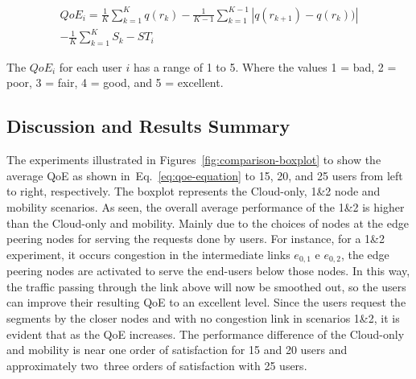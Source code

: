 \begin{equation}\label{eq:qoe-equation}
\begin{split}
QoE_i = \frac{1}{K} \sum_{k=1}^{K}q(r_{k}) - \frac{1}{K-1} \sum_{k=1}^{K-1}|q(r_{k+1}) - q(r_{k}))| \\
- \frac{1}{K}\sum_{k=1}^{K} S_{k} - ST_{i}
\end{split}
\end{equation}

The $QoE_{i}$ for each user $i$ has a range of 1 to 5. Where the values 1 = bad, 2 = poor, 3 = fair, 4 = good, and 5 = excellent.



\subsection{Discussion and Results Summary}


The experiments illustrated in Figures~\ref{fig:comparison-boxplot} to show the average QoE as shown in~Eq.~\ref{eq:qoe-equation} to 15, 20, and 25 users from left to right, respectively. The boxplot represents the Cloud-only, 1\&2 node and mobility scenarios. As seen, the overall average performance of the 1\&2 is higher than the Cloud-only and mobility. Mainly due to the choices of nodes at the edge peering nodes for serving the requests done by users. 
%
For instance, for a 1\&2 experiment, it occurs congestion in the intermediate links $e_{0,1}$ e $e_{0,2}$, 
the edge peering nodes are activated to serve the end-users below those nodes. In this way, the traffic passing through the link above will now be smoothed out, so the users can improve their resulting QoE to an excellent level.
%
Since the users request the segments by the closer nodes and with no congestion link in scenarios 1\&2, it is evident that as the QoE increases. %
%
The performance difference of the Cloud-only and mobility is near one order of satisfaction for 15 and 20 users and approximately two~three orders of satisfaction with 25 users.


